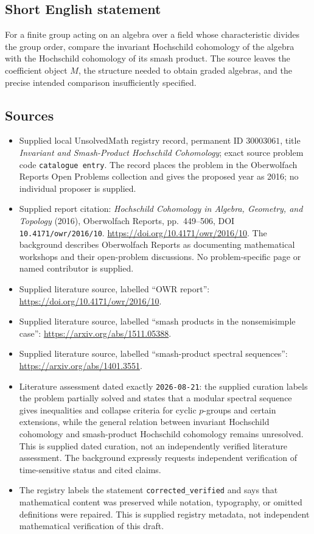 \documentclass[11pt]{article}
\begin{document}
\subsection{Short English statement}
For a finite group acting on an algebra over a field whose characteristic divides the group order, compare the invariant Hochschild cohomology of the algebra with the Hochschild cohomology of its smash product. The source leaves the coefficient object \(M\), the structure needed to obtain graded algebras, and the precise intended comparison insufficiently specified.
\subsection{Sources}
\begin{itemize}
\item Supplied local UnsolvedMath registry record, permanent ID \(30003061\), title \emph{Invariant and Smash-Product Hochschild Cohomology}; exact source problem code \texttt{catalogue entry}. The record places the problem in the Oberwolfach Reports Open Problems collection and gives the proposed year as 2016; no individual proposer is supplied.
\item Supplied report citation: \emph{Hochschild Cohomology in Algebra, Geometry, and Topology} (2016), Oberwolfach Reports, pp.\ 449--506, DOI \texttt{10.4171/owr/2016/10}. \url{https://doi.org/10.4171/owr/2016/10}. The background describes Oberwolfach Reports as documenting mathematical workshops and their open-problem discussions. No problem-specific page or named contributor is supplied.
\item Supplied literature source, labelled ``OWR report'': \url{https://doi.org/10.4171/owr/2016/10}.
\item Supplied literature source, labelled ``smash products in the nonsemisimple case'': \url{https://arxiv.org/abs/1511.05388}.
\item Supplied literature source, labelled ``smash-product spectral sequences'': \url{https://arxiv.org/abs/1401.3551}.
\item Literature assessment dated exactly \texttt{2026-08-21}: the supplied curation labels the problem partially solved and states that a modular spectral sequence gives inequalities and collapse criteria for cyclic \(p\)-groups and certain extensions, while the general relation between invariant Hochschild cohomology and smash-product Hochschild cohomology remains unresolved. This is supplied dated curation, not an independently verified literature assessment. The background expressly requests independent verification of time-sensitive status and cited claims.
\item The registry labels the statement \texttt{corrected\_verified} and says that mathematical content was preserved while notation, typography, or omitted definitions were repaired. This is supplied registry metadata, not independent mathematical verification of this draft.
\end{itemize}
\end{document}
